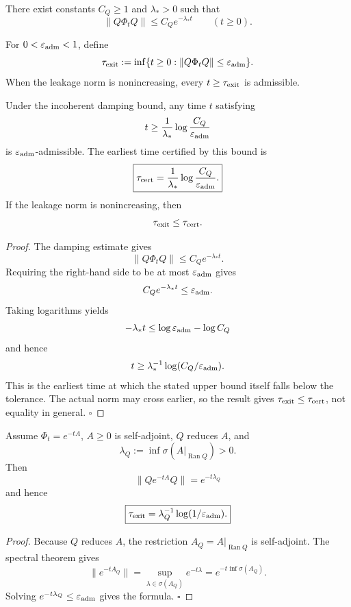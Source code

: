 \documentclass[11pt]{article}
\begin{document}
\begin{assumption}
There exist constants \(C_Q\ge1\) and \(\lambda_\ast>0\) such that
\[
\|Q\Phi_tQ\|\le C_Qe^{-\lambda_\ast t}
\qquad (t\ge0).
\]
\end{assumption}

\begin{definition}
For \(0<\varepsilon_{\rm adm}<1\), define
\[
\tau_{\rm exit}
:=
\inf\{t\ge0:\|Q\Phi_tQ\|\le\varepsilon_{\rm adm}\}.
\]
When the leakage norm is nonincreasing, every \(t\ge\tau_{\rm exit}\) is admissible.
\end{definition}

\begin{theorem}
Under the incoherent damping bound, any time \(t\) satisfying
\[
t\ge \frac{1}{\lambda_\ast}\log\frac{C_Q}{\varepsilon_{\rm adm}}
\]
is \(\varepsilon_{\rm adm}\)-admissible. The earliest time certified by this bound is
\[
\boxed{
\tau_{\rm cert}
=
\frac{1}{\lambda_\ast}\log\frac{C_Q}{\varepsilon_{\rm adm}} .
}
\]
If the leakage norm is nonincreasing, then
\[
\tau_{\rm exit}\le\tau_{\rm cert}.
\]
\end{theorem}

\begin{proof}
The damping estimate gives
\[
\|Q\Phi_tQ\|\le C_Qe^{-\lambda_\ast t}.
\]
Requiring the right-hand side to be at most \(\varepsilon_{\rm adm}\) gives
\[
C_Qe^{-\lambda_\ast t}\le \varepsilon_{\rm adm}.
\]
Taking logarithms yields
\[
-\lambda_\ast t\le \log \varepsilon_{\rm adm}-\log C_Q
\]
and hence
\[
t\ge \lambda_\ast^{-1}\log(C_Q/\varepsilon_{\rm adm}).
\]
This is the earliest time at which the stated upper bound itself falls below the tolerance.
The actual norm may cross earlier, so the result gives
\(\tau_{\rm exit}\le\tau_{\rm cert}\), not equality in general. \(\square\)
\end{proof}

\begin{theorem}
Assume \(\Phi_t=e^{-tA}\), \(A\ge0\) is self-adjoint, \(Q\) reduces \(A\), and
\[
\lambda_Q:=\inf\sigma(A|_{\operatorname{Ran}Q})>0.
\]
Then
\[
\|Qe^{-tA}Q\|=e^{-t\lambda_Q}
\]
and hence
\[
\boxed{\tau_{\rm exit}=\lambda_Q^{-1}\log(1/\varepsilon_{\rm adm}).}
\]
\end{theorem}

\begin{proof}
Because \(Q\) reduces \(A\), the restriction \(A_Q=A|_{\operatorname{Ran}Q}\) is
self-adjoint. The spectral theorem gives
\[
\|e^{-tA_Q}\|=\sup_{\lambda\in\sigma(A_Q)}e^{-t\lambda}
=e^{-t\inf\sigma(A_Q)}.
\]
Solving \(e^{-t\lambda_Q}\le\varepsilon_{\rm adm}\) gives the formula. \(\square\)
\end{proof}
\end{document}

